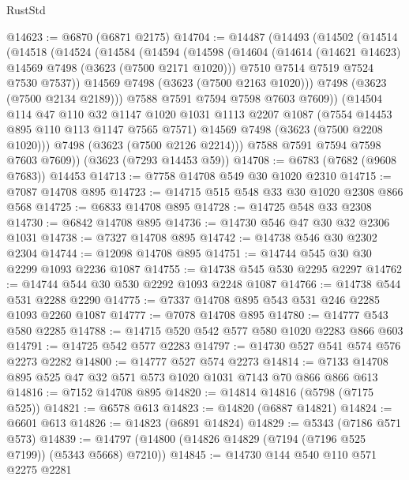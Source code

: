 \begin{lexlean}{RustStd}
\begin{coremodule}
@14623 := @6870 (@6871 @2175)
@14704 := @14487
    (@14493
      (@14502
        (@14514
          (@14518
            (@14524
              (@14584
                (@14594
                  (@14598
                    (@14604
                      (@14614 (@14621 @14623) @14569 @7498 (@3623 (@7500 @2171 @1020)))
                      @7510
                      @7514
                      @7519
                      @7524
                      @7530
                      @7537))
                  @14569
                  @7498
                  (@3623 (@7500 @2163 @1020)))
                @7498
                (@3623 (@7500 @2134 @2189)))
              @7588
              @7591
              @7594
              @7598
              @7603
              @7609))
          (@14504
            @114
            @47
            @110
            @32
            @1147
            @1020
            @1031
            @1113
            @2207
            @1087
            (@7554 @14453 @895 @110 @113 @1147 @7565 @7571)
            @14569
            @7498
            (@3623 (@7500 @2208 @1020)))
          @7498
          (@3623 (@7500 @2126 @2214)))
        @7588
        @7591
        @7594
        @7598
        @7603
        @7609))
    (@3623 (@7293 @14453 @59))
@14708 := @6783 (@7682 (@9608 @7683)) @14453
@14713 := @7758 @14708 @549 @30 @1020 @2310
@14715 := @7087 @14708 @895
@14723 := @14715 @515 @548 @33 @30 @1020 @2308 @866 @568
@14725 := @6833 @14708 @895
@14728 := @14725 @548 @33 @2308
@14730 := @6842 @14708 @895
@14736 := @14730 @546 @47 @30 @32 @2306 @1031
@14738 := @7327 @14708 @895
@14742 := @14738 @546 @30 @2302 @2304
@14744 := @12098 @14708 @895
@14751 := @14744 @545 @30 @30 @2299 @1093 @2236 @1087
@14755 := @14738 @545 @530 @2295 @2297
@14762 := @14744 @544 @30 @530 @2292 @1093 @2248 @1087
@14766 := @14738 @544 @531 @2288 @2290
@14775 := @7337 @14708 @895 @543 @531 @246 @2285 @1093 @2260 @1087
@14777 := @7078 @14708 @895
@14780 := @14777 @543 @580 @2285
@14788 := @14715 @520 @542 @577 @580 @1020 @2283 @866 @603
@14791 := @14725 @542 @577 @2283
@14797 := @14730 @527 @541 @574 @576 @2273 @2282
@14800 := @14777 @527 @574 @2273
@14814 := @7133 @14708 @895 @525 @47 @32 @571 @573 @1020 @1031 @7143 @70 @866 @866 @613
@14816 := @7152 @14708 @895
@14820 := @14814 @14816 (@5798 (@7175 @525))
@14821 := @6578 @613
@14823 := @14820 (@6887 @14821)
@14824 := @6601 @613
@14826 := @14823 (@6891 @14824)
@14829 := @5343 (@7186 @571 @573)
@14839 := @14797 (@14800 (@14826 @14829 (@7194 (@7196 @525 @7199)) (@5343 @5668) @7210))
@14845 := @14730 @144 @540 @110 @571 @2275 @2281

\end{coremodule}
\end{lexlean}
